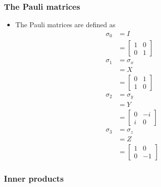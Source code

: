 \documentclass{article}
\begin{document}
\subsubsection{The Pauli matrices}

\begin{itemize}
  \item The Pauli matrices are defined as \begin{align*}
          \sigma_0 & = I              \\
                   & = \begin{bmatrix}
                         1 & 0 \\
                         0 & 1
                       \end{bmatrix} \\
          \sigma_1 & = \sigma_x       \\
                   & = X              \\
                   & = \begin{bmatrix}
                         0 & 1 \\
                         1 & 0
                       \end{bmatrix} \\
          \sigma_2 & = \sigma_y       \\
                   & = Y              \\
                   & = \begin{bmatrix}
                         0 & -i \\
                         i & 0
                       \end{bmatrix} \\
          \sigma_3 & = \sigma_z       \\
                   & = Z              \\
                   & = \begin{bmatrix}
                         1 & 0  \\
                         0 & -1
                       \end{bmatrix}
        \end{align*}
\end{itemize}

\subsubsection{Inner products}
\end{document}

